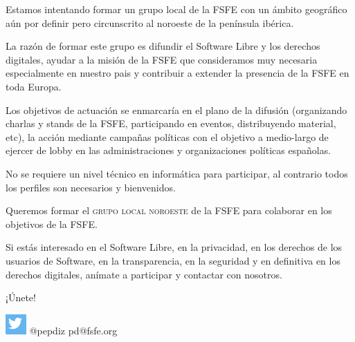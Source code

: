 \documentclass[10pt,foldmark,tumble]{leaflet}
\begin{document}
Estamos intentando formar un grupo local de la FSFE con un ámbito geográfico aún por definir pero circunscrito al noroeste de la península ibérica.

La razón de formar este grupo es difundir el Software Libre y los derechos digitales, ayudar a la misión de la FSFE que consideramos muy necesaria especialmente en nuestro pais y contribuir a extender la presencia de la FSFE en toda Europa.

Los objetivos de actuación se enmarcaría en el plano de la difusión (organizando charlas y stands de la FSFE, participando en eventos, distribuyendo material, etc), la acción mediante campañas políticas con el objetivo a medio-largo de ejercer de lobby en las administraciones y organizaciones políticas españolas.

No se requiere un nivel técnico en informática para participar, al contrario todos los perfiles son necesarios y bienvenidos.

\vspace{5em}

\begin{mdframed}[style=MyFrame]
Queremos formar el \textsc{grupo local noroeste} de la FSFE para colaborar en los objetivos de la FSFE.

Si estás interesado en el Software Libre, en la privacidad, en los derechos de los usuarios de Software, en la transparencia, en la seguridad y en definitiva en los derechos digitales, anímate a participar y contactar con nosotros.

\center \Huge{¡Únete!}

\includegraphics[scale=0.8]{tw.png} \Large @pepdiz pd@fsfe.org
\end{mdframed}
\end{document}
